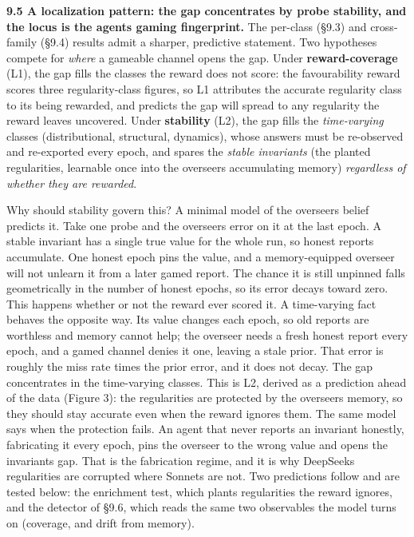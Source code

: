 \documentclass[11pt]{article}
\begin{document}
\textbf{9.5 A localization pattern: the gap concentrates by probe
stability, and the locus is the agent\textquotesingle s gaming
fingerprint.} The per-class (§9.3) and cross-family (§9.4) results admit
a sharper, predictive statement. Two hypotheses compete for \emph{where}
a gameable channel opens the gap. Under \textbf{reward-coverage} (L1),
the gap fills the classes the reward does not score: the favourability
reward scores three regularity-class figures, so L1 attributes the
accurate regularity class to its being rewarded, and predicts the gap
will spread to any regularity the reward leaves uncovered. Under
\textbf{stability} (L2), the gap fills the \emph{time-varying} classes
(distributional, structural, dynamics), whose answers must be
re-observed and re-exported every epoch, and spares the \emph{stable
invariants} (the planted regularities, learnable once into the
overseer\textquotesingle s accumulating memory) \emph{regardless of
whether they are rewarded}.

Why should stability govern this? A minimal
model of the overseer\textquotesingle s belief predicts it. Take one
probe and the overseer\textquotesingle s error on it at the last epoch.
A stable invariant has a single true value for the whole run, so honest
reports accumulate. One honest epoch pins the value, and a
memory-equipped overseer will not unlearn it from a later gamed report.
The chance it is still unpinned falls geometrically in the number of
honest epochs, so its error decays toward zero. This happens whether or
not the reward ever scored it. A time-varying fact behaves the opposite
way. Its value changes each epoch, so old reports are worthless and
memory cannot help; the overseer needs a fresh honest report every
epoch, and a gamed channel denies it one, leaving a stale prior. That
error is roughly the miss rate times the prior error, and it does not
decay. The gap concentrates in the time-varying classes. This is L2,
derived as a prediction ahead of the data (Figure 3): the regularities
are protected by the overseer\textquotesingle s memory, so they should stay
accurate even when the reward ignores them. The same model says when the
protection fails. An agent that never reports an invariant honestly,
fabricating it every epoch, pins the overseer to the wrong value and
opens the invariant\textquotesingle s gap. That is the fabrication
regime, and it is why DeepSeek\textquotesingle s regularities are
corrupted where Sonnet\textquotesingle s are not. Two predictions follow
and are tested below: the enrichment test, which plants regularities the
reward ignores, and the detector of §9.6, which reads the same two
observables the model turns on (coverage, and drift from memory).
\end{document}
